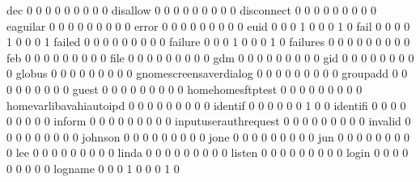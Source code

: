 \documentclass[compress,8pt]{beamer}
\begin{document}
\begin{frame}
\begin{Schunk}
  dec                                        0   0   0   0   0   0   0   0   0
  disallow                                   0   0   0   0   0   0   0   0   0
  disconnect                                 0   0   0   0   0   0   0   0   0
  eaguilar                                   0   0   0   0   0   0   0   0   0
  error                                      0   0   0   0   0   0   0   0   0
  euid                                       0   0   0   1   0   0   0   1   0
  fail                                       0   0   0   0   1   0   0   0   1
  failed                                     0   0   0   0   0   0   0   0   0
  failure                                    0   0   0   1   0   0   0   1   0
  failures                                   0   0   0   0   0   0   0   0   0
  feb                                        0   0   0   0   0   0   0   0   0
  file                                       0   0   0   0   0   0   0   0   0
  gdm                                        0   0   0   0   0   0   0   0   0
  gid                                        0   0   0   0   0   0   0   0   0
  globus                                     0   0   0   0   0   0   0   0   0
  gnomescreensaverdialog                     0   0   0   0   0   0   0   0   0
  groupadd                                   0   0   0   0   0   0   0   0   0
  guest                                      0   0   0   0   0   0   0   0   0
  homehomesftptest                           0   0   0   0   0   0   0   0   0
  homevarlibavahiautoipd                     0   0   0   0   0   0   0   0   0
  identif                                    0   0   0   0   0   0   1   0   0
  identifi                                   0   0   0   0   0   0   0   0   0
  inform                                     0   0   0   0   0   0   0   0   0
  inputuserauthrequest                       0   0   0   0   0   0   0   0   0
  invalid                                    0   0   0   0   0   0   0   0   0
  johnson                                    0   0   0   0   0   0   0   0   0
  jone                                       0   0   0   0   0   0   0   0   0
  jun                                        0   0   0   0   0   0   0   0   0
  lee                                        0   0   0   0   0   0   0   0   0
  linda                                      0   0   0   0   0   0   0   0   0
  listen                                     0   0   0   0   0   0   0   0   0
  login                                      0   0   0   0   0   0   0   0   0
  logname                                    0   0   0   1   0   0   0   1   0

\end{Schunk}
\end{frame}
\end{document}

